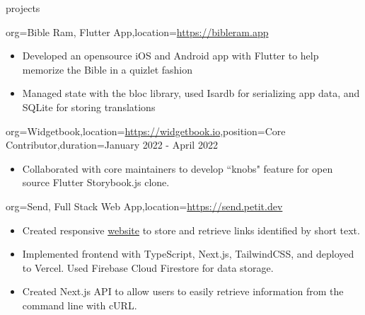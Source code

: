 \documentclass{resume}
\begin{document}
\begin{ResumeSection}{projects}
    \begin{ResumeProject}{org={Bible Ram, Flutter
        App},location={\href{https://bibleram.app}{https://bibleram.app}}}
        \begin{itemize}
            \item {Developed an opensource iOS and Android app with Flutter to help memorize the Bible in a quizlet
                fashion} 
            \item {Managed state with the bloc library,
                used Isardb for serializing app data, and SQLite for storing
            translations}
        \end{itemize}
    \end{ResumeProject}
    \begin{ResumeProject}{org={Widgetbook},location={\href{https://www.widgetbook.io/}{https://widgetbook.io}},position={Core Contributor},duration={January 2022 - April 2022}}
        \begin{itemize}
            \item Collaborated with core maintainers to develop ``knobs" feature for open source Flutter Storybook.js clone.
        \end{itemize}
    \end{ResumeProject}
    \begin{ResumeProject}{org={Send, Full Stack Web App},location={\href{https://send.petit.dev}{https://send.petit.dev}}}
        \begin{itemize}
            \item {Created responsive \href{https://send.petit.dev}{website} to store and retrieve links identified by short text.}
            \item {Implemented frontend with TypeScript, Next.js, TailwindCSS, and deployed to Vercel. Used Firebase Cloud Firestore for data storage.}
            \item {Created Next.js API to allow users to easily retrieve information from the command line with cURL.}
        \end{itemize}
    \end{ResumeProject}
\end{ResumeSection}
\end{document}

